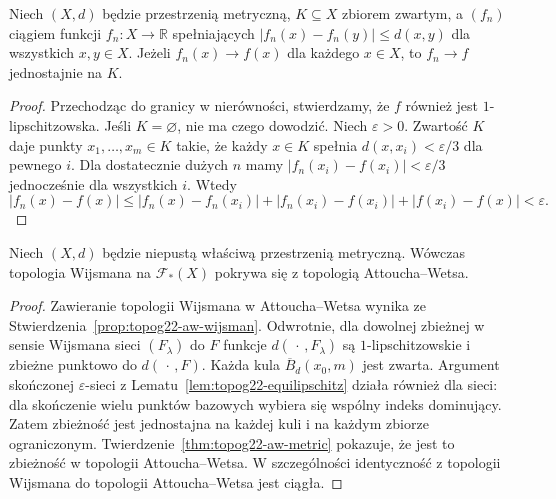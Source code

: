 \begin{lemat}
\label{lem:topog22-equilipschitz}
Niech \((X,d)\) będzie przestrzenią metryczną,
\(K\subseteq X\) zbiorem zwartym,
a \((f_n)\) ciągiem funkcji
\(f_n\colon X\to\mathbb R\)
spełniających
\(|f_n(x)-f_n(y)|\le d(x,y)\) dla wszystkich \(x,y\in X\).
Jeżeli \(f_n(x)\to f(x)\) dla każdego \(x\in X\),
to \(f_n\to f\) jednostajnie na \(K\).
\end{lemat}
\begin{proof}
Przechodząc do granicy w nierówności,
stwierdzamy, że \(f\) również jest
\(1\)-lipschitzowska.
Jeśli \(K=\varnothing\), nie ma czego dowodzić.
Niech \(\varepsilon>0\).
Zwartość \(K\) daje punkty \(x_1,\ldots,x_m\in K\)
takie, że każdy \(x\in K\)
spełnia \(d(x,x_i)<\varepsilon/3\)
dla pewnego \(i\).
Dla dostatecznie dużych \(n\) mamy
\(|f_n(x_i)-f(x_i)|<\varepsilon/3\)
jednocześnie dla wszystkich \(i\).
Wtedy
\[
 |f_n(x)-f(x)|
 \le |f_n(x)-f_n(x_i)|
     +|f_n(x_i)-f(x_i)|+|f(x_i)-f(x)|
 <\varepsilon.
\]
\end{proof}

\begin{twierdzenie}
\label{thm:topog22-proper-wijsman-aw}
Niech \((X,d)\) będzie niepustą właściwą
przestrzenią metryczną. Wówczas
topologia Wijsmana na \(\mathcal F_*(X)\)
pokrywa się z topologią Attoucha--Wetsa.
\end{twierdzenie}
\begin{proof}
Zawieranie topologii Wijsmana w Attoucha--Wetsa
wynika ze Stwierdzenia~\ref{prop:topog22-aw-wijsman}.
Odwrotnie, dla dowolnej zbieżnej w sensie Wijsmana
sieci \((F_\lambda)\) do \(F\)
funkcje \(d(\,\cdot\,,F_\lambda)\)
są \(1\)-lipschitzowskie i zbieżne punktowo
do \(d(\,\cdot\,,F)\).
Każda kula \(\overline B_d(x_0,m)\) jest zwarta.
Argument skończonej \(\varepsilon\)-sieci
z Lematu~\ref{lem:topog22-equilipschitz}
działa również dla sieci:
dla skończenie wielu punktów bazowych
wybiera się wspólny indeks dominujący.
Zatem zbieżność jest jednostajna na każdej
kuli i na każdym zbiorze ograniczonym.
Twierdzenie~\ref{thm:topog22-aw-metric}
pokazuje, że jest to zbieżność
w topologii Attoucha--Wetsa.
W szczególności identyczność z topologii Wijsmana
do topologii Attoucha--Wetsa jest ciągła.
\end{proof}

